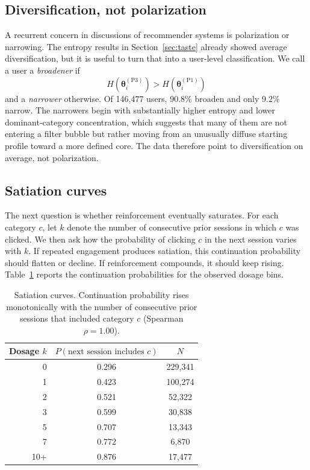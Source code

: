 \documentclass[11pt]{article}
\begin{document}
\subsection{Diversification, not polarization}

A recurrent concern in discussions of recommender systems is polarization or narrowing. The entropy results in Section~\ref{sec:taste} already showed average diversification, but it is useful to turn that into a user-level classification. We call a user a \emph{broadener} if
\[
H\!\left(\boldsymbol{\theta}_i^{(\mathrm{P3})}\right)
>
H\!\left(\boldsymbol{\theta}_i^{(\mathrm{P1})}\right)
\]
and a \emph{narrower} otherwise. Of 146,477 users, 90.8\% broaden and only 9.2\% narrow. The narrowers begin with substantially higher entropy and lower dominant-category concentration, which suggests that many of them are not entering a filter bubble but rather moving from an unusually diffuse starting profile toward a more defined core. The data therefore point to diversification on average, not polarization.

\subsection{Satiation curves}

The next question is whether reinforcement eventually saturates. For each category $c$, let $k$ denote the number of consecutive prior sessions in which $c$ was clicked. We then ask how the probability of clicking $c$ in the next session varies with $k$. If repeated engagement produces satiation, this continuation probability should flatten or decline. If reinforcement compounds, it should keep rising. Table~\ref{tab:satiation} reports the continuation probabilities for the observed dosage bins.

\begin{table}[ht]
\centering
\caption{Satiation curves. Continuation probability rises monotonically with the number of consecutive prior sessions that included category $c$ (Spearman $\rho = 1.00$).}
\label{tab:satiation}
\begin{tabular}{rcc}
\toprule
Dosage $k$ & $P(\text{next session includes } c)$ & $N$ \\
\midrule
0 & 0.296 & 229,341 \\
1 & 0.423 & 100,274 \\
2 & 0.521 & 52,322 \\
3 & 0.599 & 30,838 \\
5 & 0.707 & 13,343 \\
7 & 0.772 & 6,870 \\
10+ & 0.876 & 17,477 \\
\bottomrule
\end{tabular}
\end{table}
\FloatBarrier
\end{document}
